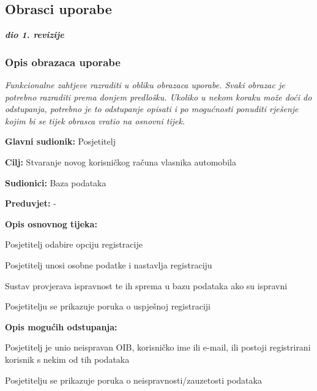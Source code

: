 			\eject 
			
			
				
			\subsection{Obrasci uporabe}
				
				\textbf{\textit{dio 1. revizije}}
				
				\subsubsection{Opis obrazaca uporabe}
					\textit{Funkcionalne zahtjeve razraditi u obliku obrazaca uporabe. Svaki obrazac je potrebno razraditi prema donjem predlošku. Ukoliko u nekom koraku može doći do odstupanja, potrebno je to odstupanje opisati i po mogućnosti ponuditi rješenje kojim bi se tijek obrasca vratio na osnovni tijek.}\\
					


\noindent {}
\begin{packed_item}

	\item \textbf{Glavni sudionik: } Posjetitelj
	\item  \textbf{Cilj:} Stvaranje novog korisničkog računa vlasnika
	automobila
	\item  \textbf{Sudionici:} Baza podataka
	\item  \textbf{Preduvjet:} -
	\item  \textbf{Opis osnovnog tijeka:}

	\item[] \begin{packed_enum}

		\item Posjetitelj odabire opciju registracije
		\item Posjetitelj unosi osobne podatke i nastavlja registraciju
		\item Sustav provjerava ispravnost te ih sprema u bazu podataka ako su ispravni
		\item Posjetitelju se prikazuje poruka o uspješnoj registraciji
	\end{packed_enum}

	\item  \textbf{Opis mogućih odstupanja:}

	\item[] \begin{packed_item}

		\item[3.a] Posjetitelj je unio neispravan OIB, korisničko ime ili e-mail,
		ili postoji registrirani korisnik s nekim od tih podataka
		\item[] \begin{packed_enum}

			\item Posjetitelju se prikazuje poruka o neispravnosti/zauzetosti
			podataka

		\end{packed_enum}

	\end{packed_item}
\end{packed_item}

